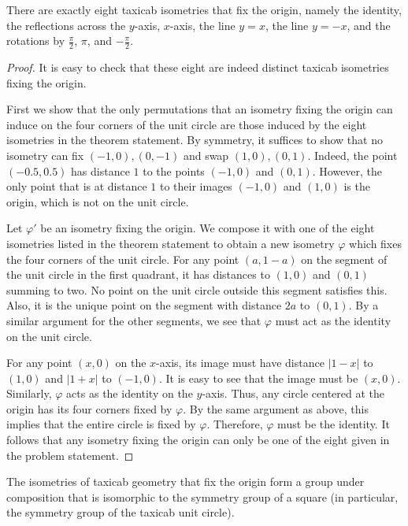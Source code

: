 \documentclass{mystyle}
\begin{document}
\begin{theorem}\label{thm_taxicab_isometry}
    There are exactly eight taxicab isometries that fix the origin, namely the identity, the reflections across the $y$-axis, $x$-axis, the line $y=x$, the line $y=-x$, and the rotations by $\frac{\pi}{2}$, $\pi$, and $-\frac{\pi}{2}$.
\end{theorem}
\begin{proof}
    It is easy to check that these eight are indeed distinct taxicab isometries fixing the origin. 
    
    First we show that the only permutations that an isometry fixing the origin can induce on the four corners of the unit circle are those induced by the eight isometries in the theorem statement. By symmetry, it suffices to show that no isometry can fix $(-1, 0), (0, -1)$ and swap $(1,0), (0,1)$. Indeed, the point $(-0.5, 0.5)$ has distance $1$ to the points $(-1, 0)$ and $(0,1)$. However, the only point that is at distance $1$ to their images $(-1, 0)$ and $(1, 0)$ is the origin, which is not on the unit circle. 

    Let $\varphi'$ be an isometry fixing the origin. We compose it with one of the eight isometries listed in the theorem statement to obtain a new isometry $\varphi$ which fixes the four corners of the unit circle. For any point $(a, 1 - a)$ on the segment of the unit circle in the first quadrant, it has distances to $(1, 0)$ and $(0, 1)$ summing to two. No point on the unit circle outside this segment satisfies this. Also, it is the unique point on the segment with distance $2a$ to $(0, 1)$. By a similar argument for the other segments, we see that $\varphi$ must act as the identity on the unit circle. 
    
    
    For any point $(x, 0)$ on the $x$-axis, its image must have distance $|1-x|$ to $(1, 0)$ and $|1+x|$ to $(-1, 0)$. It is easy to see that the image must be $(x, 0)$. Similarly, $\varphi$ acts as the identity on the $y$-axis. Thus, any circle centered at the origin has its four corners fixed by $\varphi$. By the same argument as above, this implies that the entire circle is fixed by $\varphi$. Therefore, $\varphi$ must be the identity. It follows that any isometry fixing the origin can only be one of the eight given in the problem statement.
\end{proof}
\begin{remark}
    The isometries of taxicab geometry that fix the origin form a group under composition that is isomorphic to the symmetry group of a square (in particular, the symmetry group of the taxicab unit circle). 
\end{remark}
\end{document}
